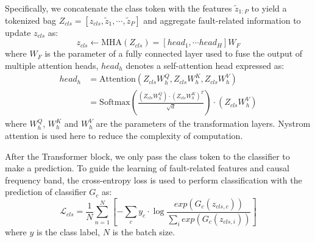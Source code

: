 \documentclass{article}
\begin{document}
	Specifically, we concatenate the class token with the features $\tilde{z}_{1:P}$ to yield a tokenized bag $Z_{cls}=[z_{cls},\tilde{z}_{1},\cdots,\tilde{z}_{P}]$ and aggregate fault-related information to update $z_{cls}$ as:
	\begin{equation}
		z_{cls}\leftarrow\mathrm{MHA}(Z_{cls})=[head_{1},\cdots head_{H}]W_{F}
	\end{equation}
	where $W_{F}$ is the parameter of a fully connected layer used to fuse the output of multiple attention heads, $head_{h}$ denotes a self-attention head expressed as:
	\begin{equation}
		\begin{aligned}
			head_{h} & =\mathrm{Attention}\left(Z_{cls}W_{h}^{Q},Z_{cls}W_{h}^{K},Z_{cls}W_{h}^{V}\right) \\
			& =\mathrm{Softmax}\left(\tfrac{\left(Z_{cls}W_{h}^{Q}\right)\cdot\left(Z_{cls}W_{h}^{K}\right)^{T}}{\sqrt{d}}\right)\cdot\left(Z_{cls}W_{h}^{V}\right)
		\end{aligned}
	\end{equation}
	where $W_{h}^{Q}$, $W_{h}^{K}$ and $W_{h}^{V}$ are the parameters of the transformation layers. Nystrom attention \cite{2021arXiv210203902X} is used here to reduce the complexity of computation.
	
	After the Transformer block, we only pass the class token to the classifier to make a prediction. To guide the learning of fault-related features and causal frequency band, the cross-entropy loss is used to perform classification with the prediction of classifier $G_{c}$ as:
	\begin{equation}
		\mathcal{L}_{cls}=\frac{1}{N}\sum_{n=1}^{N}\left[-\sum_{c}y_{c}\cdot\log\frac{exp\left(G_{c}(z_{cls,c})\right)}{\sum_{i}exp\left(G_{c}(z_{cls,i})\right)}\right]
		\label{loss_cls}
	\end{equation}
	where $y$ is the class label, $N$ is the batch size.
	
\end{document}
